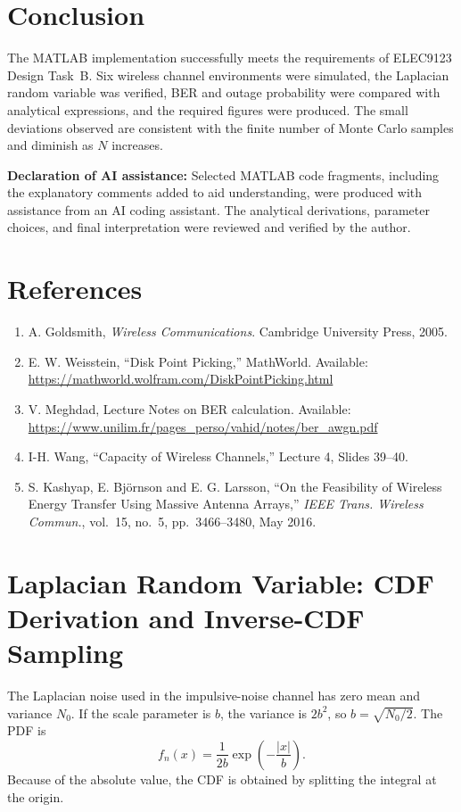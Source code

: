 \documentclass[12pt,a4paper]{article}
\begin{document}
\section{Conclusion}\label{sec:conclusion}
The MATLAB implementation successfully meets the requirements of ELEC9123 Design Task~B. Six wireless channel environments were simulated, the Laplacian random variable was verified, BER and outage probability were compared with analytical expressions, and the required figures were produced. The small deviations observed are consistent with the finite number of Monte Carlo samples and diminish as $N$ increases.

\textbf{Declaration of AI assistance:} Selected MATLAB code fragments, including the explanatory comments added to aid understanding, were produced with assistance from an AI coding assistant. The analytical derivations, parameter choices, and final interpretation were reviewed and verified by the author.

\section*{References}
\begin{enumerate}
    \item A. Goldsmith, \textit{Wireless Communications}. Cambridge University Press, 2005.
    \item E. W. Weisstein, ``Disk Point Picking,'' MathWorld. Available: \url{https://mathworld.wolfram.com/DiskPointPicking.html}
    \item V. Meghdad, Lecture Notes on BER calculation. Available: \url{https://www.unilim.fr/pages_perso/vahid/notes/ber_awgn.pdf}
    \item I-H. Wang, ``Capacity of Wireless Channels,'' Lecture 4, Slides 39--40.
    \item S. Kashyap, E. Bj\"ornson and E. G. Larsson, ``On the Feasibility of Wireless Energy Transfer Using Massive Antenna Arrays,'' \textit{IEEE Trans. Wireless Commun.}, vol.~15, no.~5, pp.~3466--3480, May 2016.
\end{enumerate}

\appendix

\section{Laplacian Random Variable: CDF Derivation and Inverse-CDF Sampling}\label{app:laplace}
The Laplacian noise used in the impulsive-noise channel has zero mean and variance $N_0$. If the scale parameter is $b$, the variance is $2b^2$, so $b=\sqrt{N_0/2}$. The PDF is
\begin{equation}
    f_n(x)=\frac{1}{2b}\exp\!\left(-\frac{|x|}{b}\right).
\end{equation}
Because of the absolute value, the CDF is obtained by splitting the integral at the origin.
\end{document}
